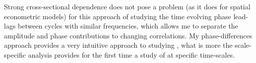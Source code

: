 \documentclass[11pt]{article}
\begin{document}

Strong cross-sectional dependence does not pose a problem (as it does for spatial econometric models) for this approach of studying the time evolving phase lead-lags between cycles with similar frequencies, which allows me to separate the amplitude and phase contributions to changing correlations. My phase-differences approach provides a very intuitive approach to studying , what is more the scale-specific analysis provides for the first time a study of  at specific time-scales.









\end{document}

